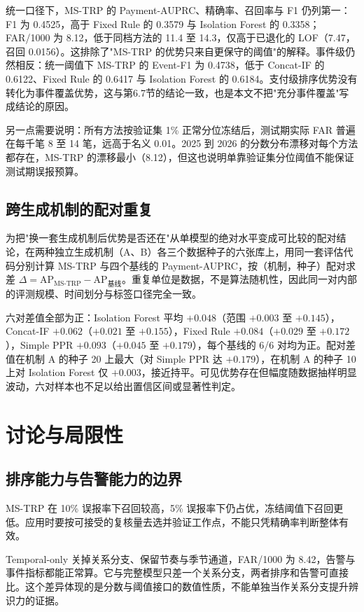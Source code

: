 \documentclass[twocolumn,11pt]{ctexart}
\begin{document}
统一口径下，MS-TRP 的 Payment-AUPRC、精确率、召回率与 F1 仍列第一：F1 为 0.4525，高于 Fixed Rule 的 0.3579 与 Isolation Forest 的 0.3358；FAR/1000 为 8.12，低于同档方法的 11.4 至 14.3，仅高于已退化的 LOF（7.47，召回 0.0156）。这排除了"MS-TRP 的优势只来自更保守的阈值"的解释。事件级仍然相反：统一阈值下 MS-TRP 的 Event-F1 为 0.4738，低于 Concat-IF 的 0.6122、Fixed Rule 的 0.6417 与 Isolation Forest 的 0.6184。支付级排序优势没有转化为事件覆盖优势，这与第6.7节的结论一致，也是本文不把"充分事件覆盖"写成结论的原因。

另一点需要说明：所有方法按验证集 1\% 正常分位冻结后，测试期实际 FAR 普遍在每千笔 8 至 14 笔，远高于名义 0.01。2025 到 2026 的分数分布漂移对每个方法都存在，MS-TRP 的漂移最小（8.12），但这也说明单靠验证集分位阈值不能保证测试期误报预算。

\subsection{跨生成机制的配对重复}
为把"换一套生成机制后优势是否还在"从单模型的绝对水平变成可比较的配对结论，在两种独立生成机制（A、B）各三个数据种子的六张库上，用同一套评估代码分别计算 MS-TRP 与四个基线的 Payment-AUPRC，按（机制，种子）配对求差 $\Delta = \mathrm{AP}_{\text{MS-TRP}} - \mathrm{AP}_{\text{基线}}$。重复单位是数据，不是算法随机性，因此同一对内部的评测规模、时间划分与标签口径完全一致。

六对差值全部为正：Isolation Forest 平均 $+0.048$（范围 $+0.003$ 至 $+0.145$），Concat-IF $+0.062$（$+0.021$ 至 $+0.155$），Fixed Rule $+0.084$（$+0.029$ 至 $+0.172$），Simple PPR $+0.093$（$+0.045$ 至 $+0.179$），每个基线的 6/6 对均为正。配对差值在机制 A 的种子 20 上最大（对 Simple PPR 达 $+0.179$），在机制 A 的种子 10 上对 Isolation Forest 仅 $+0.003$，接近持平。可见优势存在但幅度随数据抽样明显波动，六对样本也不足以给出置信区间或显著性判定。

\section{讨论与局限性}
\subsection{排序能力与告警能力的边界}
MS-TRP 在 10\% 误报率下召回较高，5\% 误报率下仍占优，冻结阈值下召回更低。应用时要按可接受的复核量去选并验证工作点，不能只凭精确率判断整体有效。

Temporal-only 关掉关系分支、保留节奏与季节通道，FAR/1000 为 8.42，告警与事件指标都能正常算。它与完整模型只差一个关系分支，两者排序和告警可直接比。这个差异体现的是分数与阈值接口的数值性质，不能单独当作关系分支提升辨识力的证据。
\end{document}
